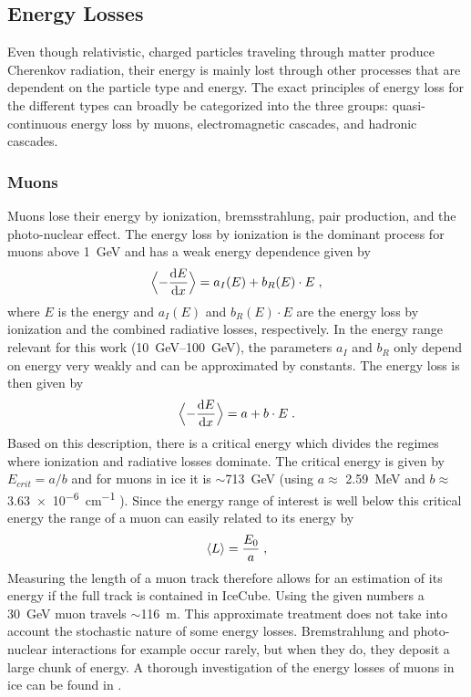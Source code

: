 \subsection{Energy Losses} 

Even though relativistic, charged particles traveling through matter produce Cherenkov radiation, their energy is mainly lost through other processes that are dependent on the particle type and energy. The exact principles of energy loss for the different types can broadly be categorized into the three groups: quasi-continuous energy loss by muons, electromagnetic cascades, and hadronic cascades.


\subsubsection{Muons}

Muons lose their energy by ionization, bremsstrahlung, pair production, and the photo-nuclear effect. The energy loss by ionization is the dominant process for muons above \SI{1}{\giga\electronvolt} and has a weak energy dependence given by
\begin{equation}
    \Bigl \langle -\frac{\mathrm{d}E}{\mathrm{d}x} \Bigr \rangle = a_I(E) + b_R(E) \cdot E
    \;,
    \labeq{radiative_losses}
\end{equation}
where $E$ is the energy and $a_I(E)$ and $b_R(E) \cdot E$ are the energy loss by ionization and the combined radiative losses, respectively. In the energy range relevant for this work (\SIrange[range-phrase=-]{10}{100}{\giga\electronvolt}), the parameters $a_I$ and $b_R$ only depend on energy very weakly and can be approximated by constants. The energy loss is then given by
\begin{equation}
    \Bigl \langle -\frac{\mathrm{d}E}{\mathrm{d}x} \Bigr \rangle = a + b \cdot E
    \;.
    \labeq{radiative_losses_simple}
\end{equation}
Based on this description, there is a critical energy which divides the regimes where ionization and radiative losses dominate. The critical energy is given by $E_{crit} = a/b$ and for muons in ice it is $\sim$\SI{713}{\giga\electronvolt} (using $a \approx$ \SI{2.59}{\mega\electronvolt} and $b \approx$ \SI{3.63e-6}{\cm^{-1}} ). Since the energy range of interest is well below this critical energy the range of a muon can easily related to its energy by
\begin{equation}
    \langle L \rangle = \frac{E_0}{a}
    \;,
    \labeq{muon_range_approx}
\end{equation}
Measuring the length of a muon track therefore allows for an estimation of its energy if the full track is contained in IceCube. Using the given numbers a \SI{30}{\giga\electronvolt} muon travels $\sim$\SI{116}{\metre}. This approximate treatment does not take into account the stochastic nature of some energy losses. Bremstrahlung and photo-nuclear interactions for example occur rarely, but when they do, they deposit a large chunk of energy. A thorough investigation of the energy losses of muons in ice can be found in .


